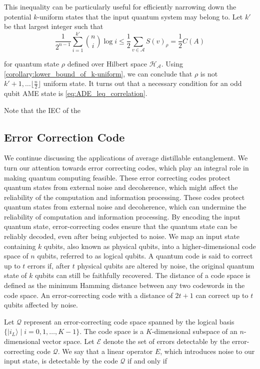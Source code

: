 \documentclass{article}
\newcommand{\ket}[1]{|#1\rangle}
\begin{document}
This inequality can be particularly useful for efficiently narrowing down the potential $k$-uniform states that the input quantum system may belong to. Let $k'$ be that largest integer such that 
\begin{equation}
\frac{1}{2^{n-1}} \sum_{i=1}^{k'} \binom{n}{i} \log i \leq \frac{1}{2} \sum_{v \in \mathcal{A}}  S(v)_{\rho} = \frac{1}{2}C(A)    
\end{equation}


for quantum state $\rho$ defined over Hilbert space $\mathcal{H_A}$. Using \ref{corollary:lower_bound_of_k-uniform}, we can conclude that $\rho$ is not $k'+1, \ldots \lfloor \frac{n}{2} \rfloor$ uniform state. It turns out that a necessary condition for an odd qubit AME state is \ref{eq:ADE_leq_correlation}. 

Note that the IEC of the 

\subsection{Error Correction Code}
We continue discussing the applications of average distillable entanglement. We turn our attention towards error correcting codes, which play an integral role in making quantum computing feasible. These error correcting codes protect quantum states from external noise and decoherence, which might affect the reliability of the computation and information processing. These codes protect quantum states from external noise and decoherence, which can undermine the reliability of computation and information processing. By encoding the input quantum state, error-correcting codes ensure that the quantum state can be reliably decoded, even after being subjected to noise. We map an input state containing $k$ qubits, also known as physical qubits, into a higher-dimensional code space of $n$ qubits, referred to as logical qubits. A quantum code is said to correct up to $t$ errors if, after $t$ physical qubits are altered by noise, the original quantum state of $k$ qubits can still be faithfully recovered. The distance of a code space is defined as the minimum Hamming distance between any two codewords in the code space. An error-correcting code with a distance of $2t + 1$ can correct up to $t$ qubits affected by noise.

Let $\mathcal{Q}$ represent an error-correcting code space spanned by the logical basis $\{\ket{i_L} \mid i = 0, 1, \ldots, K-1\}$. The code space is a $K$-dimensional subspace of an $n$-dimensional vector space. Let $\mathcal{E}$ denote the set of errors detectable by the error-correcting code $\mathcal{Q}$. We say that a linear operator $E$, which introduces noise to our input state, is detectable by the code $\mathcal{Q}$ if and only if 
\end{document}
